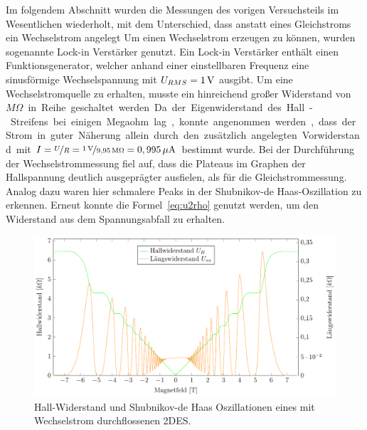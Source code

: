 
Im folgendem Abschnitt wurden die Messungen des vorigen Versuchsteils im Wesentlichen wiederholt, mit dem Unterschied, dass anstatt eines Gleichstroms ein Wechselstrom angelegt %
 Um einen Wechselstrom erzeugen zu können, wurden sogenannte Lock-in Verstärker genutzt. Ein Lock-in Verstärker enthält einen Funktionsgenerator, welcher anhand einer einstellbaren Frequenz eine sinusförmige Wechselspannung mit $U_{RMS}=\unit[1]{V}$ ausgibt. Um eine Wechselstromquelle zu erhalten, musste ein hinreichend großer Widerstand von \unit[9,95]{$M\Omega$} in Reihe geschaltet werden.
 Da der Eigenwiderstand des Hall-Streifens bei einigen Megaohm lag, konnte angenommen werden, dass der Strom in guter Näherung allein durch den zusätzlich angelegten Vorwiderstand mit  $I=\nicefrac{U}{R}=\nicefrac{\unit[1]{V}}{\unit[9,95]{M\Omega}}=\unit[0,995]{\mu A}$ bestimmt wurde. 
 Bei der Durchführung der Wechselstrommessung fiel auf, dass die Plateaus im Graphen der Hallspannung %
 deutlich ausgeprägter ausfielen, als für die Gleichstrommessung. Analog dazu waren hier schmalere Peaks in der Shubnikov-de Haas-Oszillation zu erkennen.  
 Erneut konnte die Formel~\eqref{eq:u2rho} genutzt werden, um den Widerstand aus dem Spannungsabfall zu erhalten. %



 





\begin{figure}[h]
	\centering
	\includegraphics{graphs/ac/full_range.pdf}
	\caption[Wechselstrommessung im maximalen Magnetfeldbereich]{
		Hall-Widerstand und Shubnikov-de Haas Oszillationen eines mit Wechselstrom durchflossenen 2DES.
	}
	\label{fig:full_range_ac}
\end{figure}

